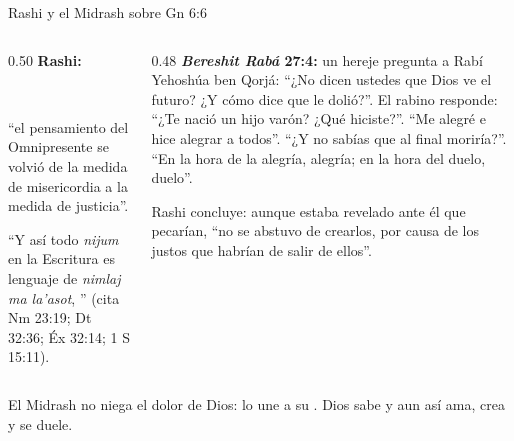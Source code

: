\begin{frame}{Rashi y el Midrash sobre Gn 6:6}
\begin{columns}[t,onlytextwidth]
\begin{column}{0.50\textwidth}\scriptsize
\textbf{Rashi:}\par\begin{center}\\ \end{center}``el pensamiento del Omnipresente se volvió de la medida de misericordia a la medida de justicia''.\par\smallskip
``Y así todo \emph{nijum} en la Escritura es lenguaje de \emph{nimlaj ma la'asot}, '' (cita Nm 23:19; Dt 32:36; Éx 32:14; 1 S 15:11).
\end{column}
\begin{column}{0.48\textwidth}\scriptsize
\textbf{\emph{Bereshit Rabá} 27:4:} un hereje pregunta a Rabí Yehoshúa ben Qorjá: ``¿No dicen ustedes que Dios ve el futuro? ¿Y cómo dice que le dolió?''. El rabino responde: ``¿Te nació un hijo varón? ¿Qué hiciste?''. ``Me alegré e hice alegrar a todos''. ``¿Y no sabías que al final moriría?''. ``En la hora de la alegría, alegría; en la hora del duelo, duelo''.\par\smallskip
Rashi concluye: aunque estaba revelado ante él que pecarían, ``no se abstuvo de crearlos, por causa de los justos que habrían de salir de ellos''.
\end{column}
\end{columns}\par\medskip
\small\RaggedRight El Midrash no niega el dolor de Dios: lo une a su . Dios sabe y aun así ama, crea y se duele.\par\smallskip
{}
\end{frame}

